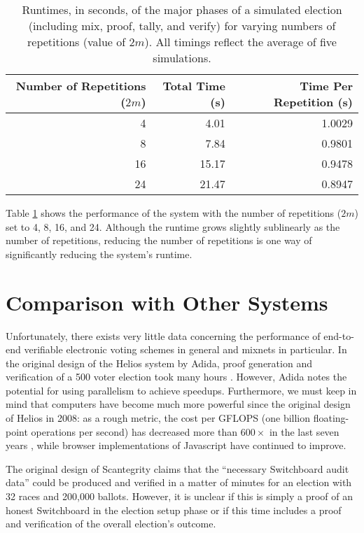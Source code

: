 \begin{table}[htbp]
\centering
\begin{tabular}{r | r | r}
  \textbf{Number of Repetitions ($2m$)} & \textbf{Total Time (s)} & \textbf{Time Per Repetition (s)} \\
  \hline
  4 & 4.01 & 1.0029 \\
  8 & 7.84 & 0.9801 \\
  16 & 15.17 & 0.9478 \\
  24 & 21.47 & 0.8947
\end{tabular}
\caption[Election runtime for varying numbers of repetitions]{Runtimes, in seconds, of the major phases of a simulated election (including mix, proof, tally, and verify) for varying numbers of repetitions (value of $2m$). All timings reflect the average of five simulations.}
\label{perf:nreps}
\end{table}

Table \ref{perf:nreps} shows the performance of the system with the number of repetitions ($2m$) set to 4, 8, 16, and 24. Although the runtime grows slightly sublinearly as the number of repetitions, reducing the number of repetitions is one way of significantly reducing the system's runtime.

\section{Comparison with Other Systems} \label{perf:comparison}

Unfortunately, there exists very little data concerning the performance of end-to-end verifiable electronic voting schemes in general and mixnets in particular. In the original design of the Helios system by Adida, proof generation and verification of a 500 voter election took many hours \cite{adida-helios}. However, Adida notes the potential for using parallelism to achieve speedups. Furthermore, we must keep in mind that computers have become much more powerful since the original design of Helios in 2008: as a rough metric, the cost per GFLOPS (one billion floating-point operations per second) has decreased more than $600 \times$ in the last seven years \cite{wiki:flops}, while browser implementations of Javascript have continued to improve.

The original design of Scantegrity \cite{scantegrity} claims that the ``necessary Switchboard audit data'' could be produced and verified in a matter of minutes for an election with 32 races and 200,000 ballots. However, it is unclear if this is simply a proof of an honest Switchboard in the election setup phase or if this time includes a proof and verification of the overall election's outcome.

